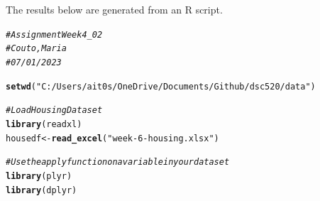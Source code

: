 \documentclass{article}\usepackage[]{graphicx}\usepackage[]{xcolor}
\makeatletter
\newcommand{\hlstr}[1]{\textcolor[rgb]{0.192,0.494,0.8}{#1}}%
\newcommand{\hlcom}[1]{\textcolor[rgb]{0.678,0.584,0.686}{\textit{#1}}}%
\newcommand{\hlstd}[1]{\textcolor[rgb]{0.345,0.345,0.345}{#1}}%
\newcommand{\hlkwb}[1]{\textcolor[rgb]{0.69,0.353,0.396}{#1}}%
\newcommand{\hlkwd}[1]{\textcolor[rgb]{0.737,0.353,0.396}{\textbf{#1}}}%
\newenvironment{kframe}{%
 \def\at@end@of@kframe{}%
 \ifinner\ifhmode%
  \def\at@end@of@kframe{\end{minipage}}%
  \begin{minipage}{\columnwidth}%
 \fi\fi%
 \def\FrameCommand##1{\hskip\@totalleftmargin \hskip-\fboxsep
 \colorbox{shadecolor}{##1}\hskip-\fboxsep
     \hskip-\linewidth \hskip-\@totalleftmargin \hskip\columnwidth}%
 \MakeFramed {\advance\hsize-\width
   \@totalleftmargin\z@ \linewidth\hsize
   \@setminipage}}%
 {\par\unskip\endMakeFramed%
 \at@end@of@kframe}
\newenvironment{knitrout}{}{} %
\makeatother
\begin{document}
\title{\title{\title{\title{\title{\title{\title{\title{\title{\title{}}}}}}}}}}



\maketitle
The results below are generated from an R script.

\begin{knitrout}
\color{fgcolor}\begin{kframe}
\begin{alltt}
\hlcom{# Assignment Week4_02}
\hlcom{# Couto, Maria}
\hlcom{# 07/01/2023}

\hlkwd{setwd}\hlstd{(}\hlstr{"C:/Users/ait0s/OneDrive/Documents/Github/dsc520/data"}\hlstd{)}

\hlcom{# Load Housing Dataset}
\hlkwd{library}\hlstd{(readxl)}
\hlstd{housedf} \hlkwb{<-} \hlkwd{read_excel}\hlstd{(}\hlstr{"week-6-housing.xlsx"}\hlstd{)}

\hlcom{# Use the apply function on a variable in your dataset}
\hlkwd{library}\hlstd{(plyr)}
\hlkwd{library}\hlstd{(dplyr)}
\end{alltt}


{\ttfamily\noindent\itshape\color{messagecolor}{\#\# \\\#\# Attaching package: 'dplyr'}}

{\ttfamily\noindent\itshape\color{messagecolor}{\#\# The following objects are masked from 'package:plyr':\\\#\# \\\#\# \ \ \ \ arrange, count, desc, failwith, id, mutate, rename, summarise, summarize}}

{\ttfamily\noindent\itshape\color{messagecolor}{\#\# The following objects are masked from 'package:stats':\\\#\# \\\#\# \ \ \ \ filter, lag}}


\end{kframe}
\end{knitrout}
\end{document}
